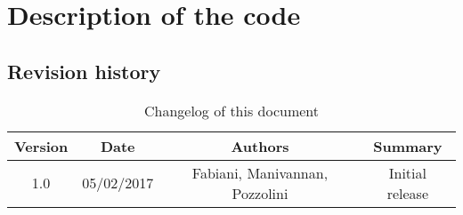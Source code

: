 \chapter{Description of the code}

\section{Revision history}
\begin{table}[h]
	\centering
	\begin{tabular}{|c|c|c|c|}
		\hline
		\textbf{Version} & \textbf{Date} & \textbf{Authors} & \textbf{Summary} \\
		\hline
		1.0 & 05/02/2017 & Fabiani, Manivannan, Pozzolini & Initial release  \\
		\hline
	\end{tabular}

	\caption{Changelog of this document}
	\label{tab:revision_history}
\end{table}

